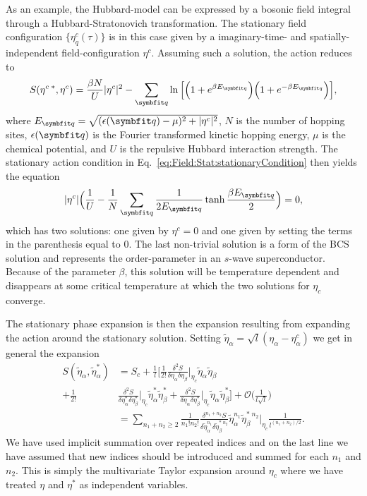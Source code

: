 As an example, the Hubbard-model can be expressed by a bosonic field integral through a Hubbard-Stratonovich transformation.
The stationary field configuration $\{\eta^c_q(\tau)\}$ is in this case given by a imaginary-time- and spatially-independent
field-configuration $\eta^c$. Assuming such a solution, the action reduces to
\begin{equation}
    \label{eq:Field:Stat:meanFieldHubbard}
    S(\eta^{c\;\ast}, \eta^c) = \frac{\beta N}{U}|\eta^c|^2 - \sum_\v{q}\ln\Big[\Big(1+e^{\beta E_\v{q}}\Big)\Big(1+e^{-\beta E_\v{q}}\Big)\Big],
\end{equation}
where $E_\v{q} = \sqrt{(\epsilon(\v{q})-\mu)^2 + |\eta^c|^2}$, $N$ is the number of hopping sites, $\epsilon(\v{q})$ is the Fourier transformed
kinetic hopping energy, $\mu$ is the chemical potential, and $U$ is the repulsive Hubbard interaction strength. The stationary action condition
in Eq.~\eqref{eq:Field:Stat:stationaryCondition} then yields the equation
\begin{equation}
    \label{eq:Field:Stat:hubbardStationary}
    |\eta^c|\Big(\frac{1}{U} - \frac{1}{N}\sum_\v{q}\frac{1}{2E_\v{q}}\tanh\frac{\beta E_\v{q}}{2}\Big) = 0,
\end{equation}
which has two solutions: one given by $\eta^c = 0$ and one given by setting the terms in the parenthesis equal to $0$. The last non-trivial solution
is a form of the BCS solution and represents the order-parameter in an $s$-wave superconductor. Because of the parameter $\beta$, this
solution will be temperature dependent and disappears at some critical temperature at which the two solutions for $\eta_c$ converge.

The stationary phase expansion is then the expansion resulting from expanding the action around the stationary solution. Setting
$\tilde{\eta}_\alpha = \sqrt{l}(\eta_\alpha-\eta^c_\alpha)$ we get in general the expansion
\begin{equation}
    \label{eq:Field:Stat:stationaryPhaseExpansion}
    \begin{split}
        S(\tilde{\eta}_\alpha,\tilde{\eta}_\alpha^\ast) &= S_c + \frac{1}{l}\bigg[\frac{1}{2!}\frac{\delta^2S}{\delta\eta_\alpha\delta\eta_\beta}\Big|_{\eta_c}\tilde{\eta}_\alpha\tilde{\eta}_\beta\\
        + \frac{1}{2!}&\frac{\delta^2S}{\delta\eta_\alpha^\ast\delta\eta_\beta^\ast}\Big|_{\eta_c}\tilde{\eta}^\ast_\alpha\tilde{\eta}^\ast_\beta
        + \frac{\delta^2S}{\delta\eta_\alpha\delta\eta_\beta^\ast}\Big|_{\eta_c}\tilde{\eta}_\alpha\tilde{\eta}_\beta^\ast\bigg] +  \mathcal{O}\Big(\frac{1}{l\sqrt{l}}\Big)\\
        &= \sum_{n_1+n_2\geq 2}\frac{1}{n_1!n_2!}\frac{\delta^{n_1+n_2}S}{\delta\tilde{\eta}_\alpha^{n_1}\delta\tilde{\eta}_\beta^{\ast\;n_2}}\tilde{\eta}_\alpha^{n_1}\tilde{\eta}_\beta^{\ast\;n_2}\Big|_{\eta_c}\frac{1}{l^{(n_1+n_2)/2}}.
    \end{split}
\end{equation}
We have used implicit summation over repeated indices and on the last line we have assumed that new indices should be introduced and summed for each $n_1$ and $n_2$.
This is simply the multivariate Taylor expansion around $\eta_c$ where we have treated $\eta$ and $\eta^\ast$ as independent variables.

